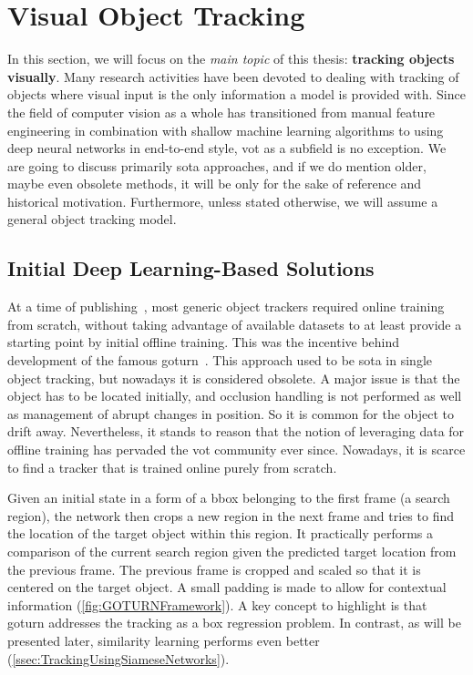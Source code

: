 \section{Visual Object Tracking}
\label{sec:VisualObjectTracking}

In this section, we will focus on the \emph{main topic} of this thesis: \textbf{tracking objects visually}. Many research activities have been devoted to dealing with tracking of objects where visual input is the only information a model is provided with. Since the field of computer vision as a whole has transitioned from manual feature engineering in combination with shallow machine learning algorithms to using deep neural networks in end-to-end style, \gls{vot} as a subfield is no exception. We are going to discuss primarily \gls{sota} approaches, and if we do mention older, maybe even obsolete methods, it will be only for the sake of reference and historical motivation. Furthermore, unless stated otherwise, we will assume a general object tracking model.

\subsection{Initial Deep Learning-Based Solutions}
\label{ssec:InitialDeepLearningBasedSolutions}

At a time of publishing~\cite{Held2016}, most generic object trackers required online training from scratch, without taking advantage of available datasets to at least provide a starting point by initial offline training. This was the incentive behind development of the famous \gls{goturn}~\cite{Held2016}. This approach used to be \gls{sota} in single object tracking, but nowadays it is considered obsolete. A major issue is that the object has to be located initially, and occlusion handling is not performed as well as management of abrupt changes in position. So it is common for the object to drift away. Nevertheless, it stands to reason that the notion of leveraging data for offline training has pervaded the \gls{vot} community ever since. Nowadays, it is scarce to find a tracker that is trained online purely from scratch.

Given an initial state in a form of a \gls{bbox} belonging to the first frame (a search region), the network then crops a new region in the next frame and tries to find the location of the target object within this region. It practically performs a comparison of the current search region given the predicted target location from the previous frame. The previous frame is cropped and scaled so that it is centered on the target object. A small padding is made to allow for contextual information (\cref{fig:GOTURNFramework}). A key concept to highlight is that \gls{goturn} addresses the tracking as a box regression problem. In contrast, as will be presented later, similarity learning performs even better (\cref{ssec:TrackingUsingSiameseNetworks}).

